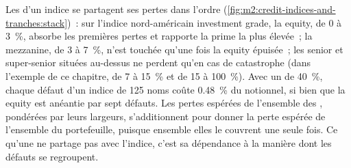 Les  d'un indice se partagent ses pertes dans l'ordre
(\cref{fig:m2:credit-indices-and-tranches:stack})~: sur l'indice nord-américain
investment grade, la  equity, de 0 à 3~\%, absorbe les premières pertes et
rapporte la prime la plus élevée~; la  mezzanine, de 3 à 7~\%, n'est touchée qu'une fois la
 equity épuisée~; les  senior et super-senior situées au-dessus ne perdent qu'en cas de catastrophe (dans
l'exemple de ce chapitre, de 7 à 15~\% et de 15 à 100~\%). Avec un  de 40~\%, chaque défaut d'un indice de 125 noms
coûte 0.48~\% du notionnel, si bien que la  equity est anéantie par sept défauts.
Les pertes espérées de l'ensemble des , pondérées par leurs largeurs, s'additionnent pour donner la
perte espérée de l'ensemble du portefeuille, puisque ensemble elles le couvrent une seule fois. Ce qu'une
 ne partage pas avec l'indice, c'est sa dépendance à la manière dont les défauts se regroupent.

